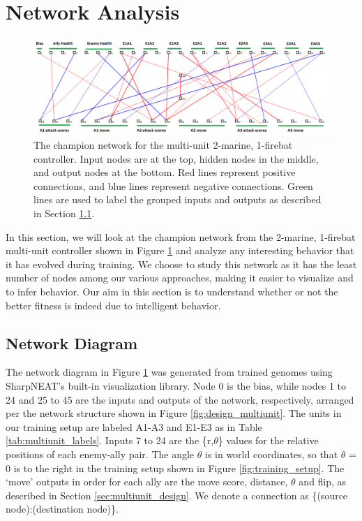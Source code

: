 \documentclass[10pt,a4paper,twocolumn]{article}
\begin{document}
\section{Network Analysis}
\label{sec:network}

\begin{figure}
\centering
\includegraphics[scale=.42]{figures/multiunit_labelled.png}
\caption{The champion network for the multi-unit 2-marine, 1-firebat controller. Input nodes are at the top, hidden nodes in the middle, and output nodes at the bottom. Red lines represent positive connections, and blue lines represent negative connections. Green lines are used to label the grouped inputs and outputs as described in Section \ref{sec:network_struct}.}
\label{fig:multiunit_mf_net}
\end{figure}

In this section, we will look at the champion network from the 2-marine, 1-firebat multi-unit controller shown in Figure \ref{fig:multiunit_mf_net} and analyze any interesting behavior that it has evolved during training. We choose to study this network as it has the least number of nodes among our various approaches, making it easier to visualize and to infer behavior. Our aim in this section is to understand whether or not the better fitness is indeed due to intelligent behavior.

\subsection{Network Diagram}
\label{sec:network_struct}

The network diagram in Figure \ref{fig:multiunit_mf_net} was generated from trained genomes using SharpNEAT's built-in visualization library. Node 0 is the bias, while nodes 1 to 24 and 25 to 45 are the inputs and outputs of the network, respectively, arranged per the network structure shown in Figure \ref{fig:design_multiunit}. The units in our training setup are labeled A1-A3 and E1-E3 as in Table \ref{tab:multiunit_labels}. Inputs 7 to 24 are the \{r,$\theta$\} values for the relative positions of each enemy-ally pair. The angle $\theta$ is in world coordinates, so that $\theta$ = 0 is to the right in the training setup shown in Figure \ref{fig:training_setup}. The `move' outputs in order for each ally are the move score, distance, $\theta$ and flip, as described in Section \ref{sec:multiunit_design}. We denote a connection as \{(source node):(destination node)\}.
\end{document}
